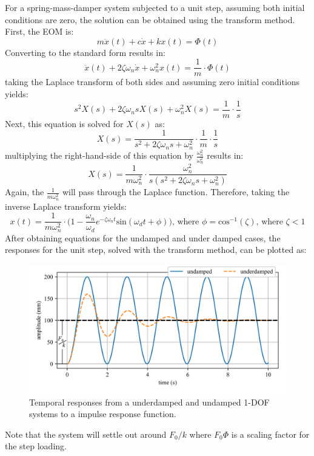 \documentclass[12pt,letter]{article}
\numberwithin{ex}{section} %
\numberwithin{re}{section} %
\begin{document}
For a spring-mass-damper system subjected to a unit step, assuming both initial conditions are zero, the solution can be obtained using the transform method. First, the EOM is:
\begin{equation}
m\ddot{x}(t) + c\dot{x} + kx(t) = \Phi(t)
\end{equation}
Converting to the standard form results in:
\begin{equation}
\ddot{x}(t) + 2  \zeta \omega_n\dot{x} + \omega_n^2x(t) = \frac{1}{m} \cdot \Phi(t)
\end{equation}
taking the Laplace transform of both sides and assuming zero initial conditions yields:
\begin{equation}
	s^2X(s) + 2  \zeta \omega_n s X(s) + \omega_n^2 X(s)  =\frac{1}{m} \cdot \frac{1}{s}
\end{equation}
Next, this equation is solved for $X(s)$ as:
\begin{equation}
	X(s) = \frac{1}{s^2 + 2  \zeta \omega_n s + \omega_n^2} \cdot \frac{1}{m} \cdot \frac{1}{s}
\end{equation}
multiplying the right-hand-side of this equation by  $\frac{\omega_n^2}{\omega_n^2}$ results in:
\begin{equation}
	X(s) = \frac{1}{m \omega_n^2} \cdot \frac{\omega_n^2}{s(s^2+2\zeta\omega_n s+\omega_n^2)}
\end{equation}
Again, the $\frac{1}{m\omega_n^2}$ will pass through the Laplace function. Therefore, taking the inverse Laplace transform yields:
\begin{equation}
	x(t) = \frac{1}{m \omega_n^2} \cdot \Big(1 - \frac{\omega_n}{\omega_d}e^{-\zeta \omega_n t}\text{sin}(\omega_dt + \phi)\Big)\text{, where } \phi = \text{cos}^{-1}(\zeta)\text{, where } \zeta<1
\end{equation}
After obtaining equations for the undamped and under damped cases, the responses for the unit step, solved with the transform method, can be plotted as:
\begin{figure}[H]
	\centering
	\includegraphics[]{../figures/response_unit_step.png}
	\caption{Temporal responses from a underdamped and undamped 1-DOF systems to a impulse response function.}
\end{figure}
Note that the system will settle out around $F_0/k$ where $F_0  \Phi$ is a scaling factor for the step loading.
\end{document}
